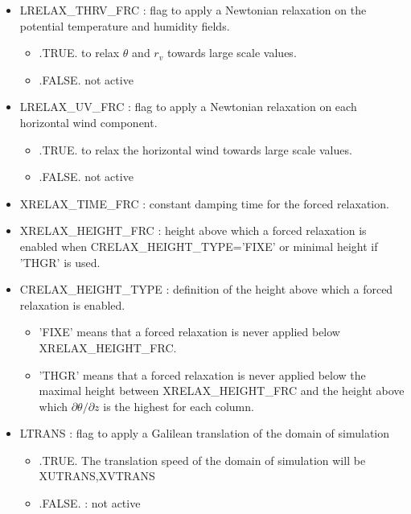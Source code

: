 \begin{itemize}
\item LRELAX\_THRV\_FRC : flag to apply a Newtonian relaxation on the
potential temperature and humidity fields.
\begin{itemize}
\item .TRUE.  to relax $\theta$ and $r_v$ towards large scale values.
\item .FALSE. not active
\end{itemize}

\item LRELAX\_UV\_FRC : flag to apply a Newtonian relaxation on each
horizontal wind component.
\begin{itemize}
\item .TRUE.  to relax the horizontal wind towards large scale values.
\item .FALSE. not active
\end{itemize}

\item XRELAX\_TIME\_FRC : constant damping time for the forced relaxation.

\item XRELAX\_HEIGHT\_FRC : height above which a forced relaxation is enabled
when CRELAX\_HEIGHT\_TYPE='FIXE' or minimal height if 'THGR' is used.

\item CRELAX\_HEIGHT\_TYPE : definition of the height above which a forced
relaxation is enabled.
\begin{itemize}
\item 'FIXE' means that a forced relaxation is never applied below
XRELAX\_HEIGHT\_FRC.
\item 'THGR' means that a forced relaxation is never applied below the maximal
height between XRELAX\_HEIGHT\_FRC and the height above which $\partial \theta
/ \partial z$ is the highest for each column.
\end{itemize}

\item LTRANS : flag to apply a Galilean translation of the domain 
of simulation
\begin{itemize}
\item  .TRUE. The translation speed of the domain of simulation will be 
XUTRANS,XVTRANS
\item .FALSE. : not active
\end{itemize}

\end{itemize}
